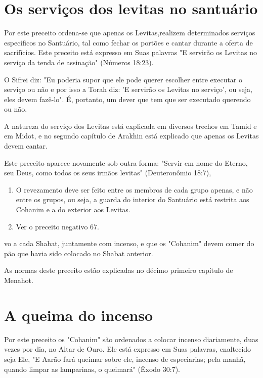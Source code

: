 \begin{itemize}
\begin{enumrate}
\begin{itemize}
\begin{itemize}
\section{Os serviços dos levitas no santuário}

Por este preceito ordena-se que apenas os Levitas,realizem determi­nados
serviços específicos no Santuário, tal como fechar os portões e cantar
durante a oferta de sacrifícios. Este preceito está expresso em Suas
palavras "E servirão os Levitas no serviço da tenda de assinação"
(Números 18:23).

O Sifrei diz: "Eu poderia supor que ele pode querer escolher entre
executar o serviço ou não e por isso a Torah diz: 'E servirão os Levitas
no servi­ço', ou seja, eles devem fazê-lo". É, portanto, um dever que
tem que ser execu­tado querendo ou não.

A natureza do serviço dos Levitas está explicada em diversos trechos em
Tamid e em Midot, e no segundo capítulo de Arakhin está explicado que
apenas os Levitas devem cantar.

Este preceito aparece novamente sob outra forma: "Servir em nome do
Eterno, seu Deus, como todos os seus irmãos levitas" (Deuteronômio
18:7),


\begin{enumerate}
\def\labelenumi{\arabic{enumi}.}
\setcounter{enumi}{47}
\item
 
 O revezamento deve ser feito entre os membros de cada grupo apenas, e
 não entre os grupos, ou seja, a guarda do interior do Santuário está
 restrita aos Cohanim e a do exterior aos Levitas.
 
\item
 
 Ver o preceito negativo 67.
 
\end{enumerate}




vo a cada Shabat, juntamente com incenso, e que os "Cohanim" devem comer
do pão que havia sido colocado no Shabat anterior.

As normas deste preceito estão explicadas no décimo primeiro capí­tulo
de Menahot.

\section{A queima do incenso}

Por este preceito os "Cohanim" são ordenados a colocar incenso
diariamente, duas vezes por dia, no Altar de Ouro. Ele está expresso em
Suas palavras, enaltecido seja Ele, "E Aarão fará queimar sobre ele,
incenso de espe­ciarias; pela manhã, quando limpar as lamparinas, o
queimará" (Êxodo 30:7).


\end{itemize}
\end{itemize}
\end{enumrate}
\end{itemize}
